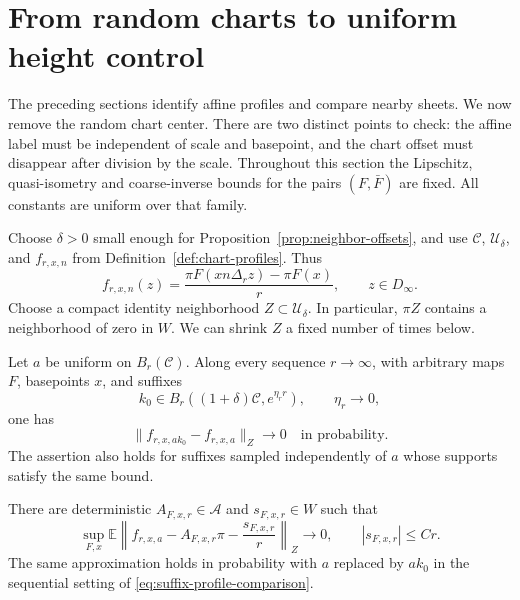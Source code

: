 \section{From random charts to uniform height control}
\label{sec:uniformity}

The preceding sections identify affine profiles and compare nearby
sheets.  We now remove the random chart center.  There are two distinct
points to check: the affine label must be independent of scale and
basepoint, and the chart offset must disappear after division by the
scale.  Throughout this section the Lipschitz, quasi-isometry and
coarse-inverse bounds for the pairs $(F,\bar F)$ are fixed.  All constants
are uniform over that family.

Choose $\delta>0$ small enough for Proposition~\ref{prop:neighbor-offsets},
and use $\mathcal C$, $\mathcal U_\delta$, and
$f_{r,x,n}$ from Definition~\ref{def:chart-profiles}.  Thus
\[
 f_{r,x,n}(z)=
 \frac{\pi F(xn\Delta_r z)-\pi F(x)}r,
 \qquad z\in D_\infty.
\]
Choose a compact identity neighborhood $Z\subset\mathcal U_\delta$.
In particular, $\pi Z$ contains a neighborhood of zero in $W$.
We can shrink $Z$ a fixed number of times below.

\begin{lemma}
\label{lem:suffix-concentration}
Let $a$ be uniform on $B_r(\mathcal C)$.  Along every sequence
$r\to\infty$, with arbitrary maps $F$, basepoints $x$, and suffixes
\[
 k_0\in B_r((1+\delta)\mathcal C,e^{\eta_r r}),
 \qquad \eta_r\longrightarrow0,
\]
one has
\begin{equation}
\label{eq:suffix-profile-comparison}
 \|f_{r,x,ak_0}-f_{r,x,a}\|_Z\longrightarrow0
 \quad\text{in probability}.
\end{equation}
The assertion also holds for suffixes sampled independently of $a$
whose supports satisfy the same bound.

There are deterministic $A_{F,x,r}\in\mathcal A$ and $s_{F,x,r}\in W$
such that
\begin{equation}
\label{eq:ordinary-chart-concentration}
 \sup_{F,x}\mathbb E\left\|
 f_{r,x,a}-A_{F,x,r}\pi-\frac{s_{F,x,r}}r
 \right\|_Z\longrightarrow0,
 \qquad |s_{F,x,r}|\le C r.
\end{equation}
The same approximation holds in probability with $a$ replaced by
$ak_0$ in the sequential setting of
\eqref{eq:suffix-profile-comparison}.
\end{lemma}

